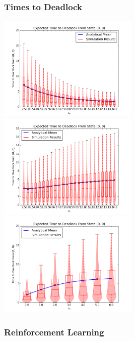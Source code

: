 \documentclass[xcolor={table}]{beamer}
\begin{document}
\begin{frame}
    \frametitle{Times to Deadlock}
    \includegraphics[width=0.5\textwidth]{vary_L1fb}
    \includegraphics[width=0.5\textwidth]{vary_mu1fb}\newline
    \centering
    \includegraphics[width=0.5\textwidth]{vary_n1fb}
\end{frame}



\begin{frame}
    \frametitle{Reinforcement Learning}
\end{frame}
\end{document}
